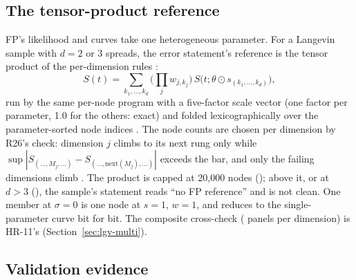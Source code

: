 \subsection{The tensor-product reference}\label{sec:het-tensor}

FP's likelihood and curves take one heterogeneous parameter. For a Langevin sample with $d=2$ or 3 spreads, the error
statement's reference is the tensor product of the per-dimension rules :
\begin{equation}
  S(t)=\sum_{k_1,\dots,k_d}\Big(\prod_j w_{j,k_j}\Big)\,S\big(t;\theta\odot s_{(k_1,\dots,k_d)}\big),
\end{equation}
run by the same per-node program with a five-factor scale vector (one factor per parameter, 1.0 for the others: exact)
and folded lexicographically over the parameter-sorted node indices . The node
counts are chosen per dimension by R26's check: dimension $j$ climbs to its next rung only while
$\sup|S_{(\dots,M_j,\dots)}-S_{(\dots,\mathrm{next}(M_j),\dots)}|$ exceeds the bar, and only the failing dimensions
climb . The product is capped at 20,000 nodes
(); above it, or at $d>3$ (), the sample's statement reads ``no FP reference'' and is not
clean. One member at $\sigma=0$ is one node at $s=1$, $w=1$, and reduces to the single-parameter curve bit for bit.
The composite cross-check ( panels per dimension) is HR-11's (Section~\ref{sec:lgv-multi}).

\subsection{Validation evidence}\label{sec:het-evidence}

